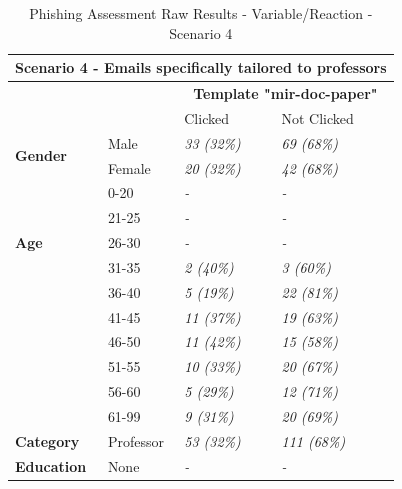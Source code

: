 \documentclass[a4paper]{article}
\begin{document}
\begingroup
\renewcommand{\arraystretch}{1.25}
\begin{table}[ht]
\begin{center}
    \begin{tabular}{ | m{7em} | m{9em} | m{9em} | m{9em} | }
    \hline
    \multicolumn{4}{|c|}{\textbf{Scenario 4 - Emails specifically tailored to professors}} \\ \hline
    & & \multicolumn{2}{|c|}{\textbf{Template "mir-doc-paper"}} \\ \hline
    & & Clicked & Not Clicked \\ \hline
    
    \multirow{2}{*}{\textbf{Gender}} 
    & Male & \textit{33 (32\%)} & \textit{69 (68\%)} \\ \cline{2-4}
    & Female & \textit{20 (32\%)} & \textit{42 (68\%)} \\ \hline
    
    \multirow{5}{*}{\textbf{Age}} 
    & 0-20 & \textit{-} & \textit{-} \\ \cline{2-4}
    & 21-25 & \textit{-} & \textit{-} \\ \cline{2-4}
    & 26-30 & \textit{-} & \textit{-} \\ \cline{2-4}
    & 31-35 & \textit{2 (40\%)} & \textit{3 (60\%)} \\ \cline{2-4}
    & 36-40 & \textit{5 (19\%)} & \textit{22 (81\%)} \\ \cline{2-4}
    & 41-45 & \textit{11 (37\%)} & \textit{19 (63\%)} \\ \cline{2-4}
    & 46-50 & \textit{11 (42\%)} & \textit{15 (58\%)} \\ \cline{2-4}
    & 51-55 & \textit{10 (33\%)} & \textit{20 (67\%)} \\ \cline{2-4}
    & 56-60 & \textit{5 (29\%)} & \textit{12 (71\%)} \\ \cline{2-4}
    & 61-99 & \textit{9 (31\%)} & \textit{20 (69\%)} \\ \hline
   
    \multirow{1}{*}{\textbf{Category}} 
    & Professor & \textit{53 (32\%)} & \textit{111 (68\%)} \\ \hline
    
    \multirow{1}{*}{\textbf{Education}}
    & None & \textit{-} & \textit{-} \\ \hline
    \end{tabular}
\end{center}
\caption{Phishing Assessment Raw Results - Variable/Reaction - Scenario 4}
\label{t-varreact4}
\end{table}
\endgroup
\end{document}

